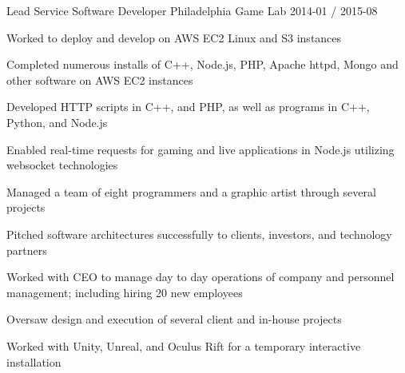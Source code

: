 \documentclass[11pt, a4paper]{awesomecv}
\begin{document}
\begin{cventries}
  \cventry
    {Lead Service Software Developer}
    {Philadelphia Game Lab}
    {}
    {2014-01 / 2015-08}
    {
          \begin{cvitems}
                    \item{Worked to deploy and develop on AWS EC2 Linux and S3 instances}
                    \item{Completed numerous installs of C++, Node.js, PHP, Apache httpd, Mongo and other software on AWS EC2 instances}
                    \item{Developed HTTP scripts in C++, and PHP, as well as programs in C++, Python, and Node.js}
                    \item{Enabled real-time requests for gaming and live applications in Node.js utilizing websocket technologies}
                    \item{Managed a team of eight programmers and a graphic artist through several projects}
                    \item{Pitched software architectures successfully to clients, investors, and technology partners}
                    \item{Worked with CEO to manage day to day operations of company and personnel management; including hiring 20 new employees}
                    \item{Oversaw design and execution of several client and in-house projects}
                    \item{Worked with Unity, Unreal, and Oculus Rift for a temporary interactive installation}
          \end{cvitems}
    }
 

\end{cventries}
\end{document}
